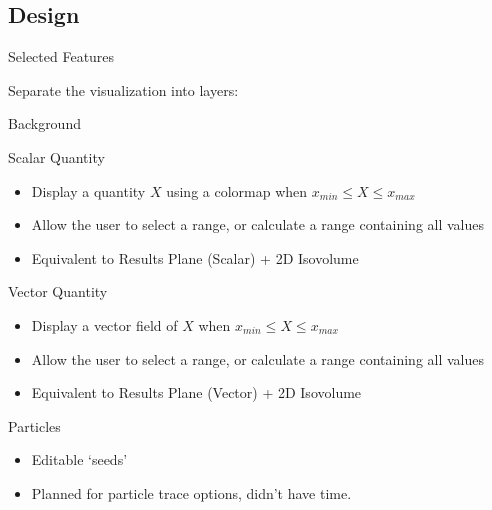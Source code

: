 \subsection{Design}

\begin{frame}{Selected Features}

        Separate the visualization into layers:
        \vspace{1em}

        \begin{wideitemize}
            \item Background
            \item Scalar Quantity
            \begin{itemize}
                \item Display a quantity $X$ using a colormap when $x_{min} \leq X \leq x_{max}$
                \item Allow the user to select a range, or calculate a range containing all values
                \item Equivalent to Results Plane (Scalar) + 2D Isovolume
            \end{itemize}
            \item Vector Quantity 
            \begin{itemize}
                \item Display a vector field of $X$ when $x_{min} \leq X \leq x_{max}$
                \item Allow the user to select a range, or calculate a range containing all values
                \item Equivalent to Results Plane (Vector) + 2D Isovolume
            \end{itemize}
            \item Particles
                \begin{itemize}
                    \item Editable `seeds'
                    \item Planned for particle trace options, didn't have time.
                \end{itemize}
        \end{wideitemize}
\end{frame}

